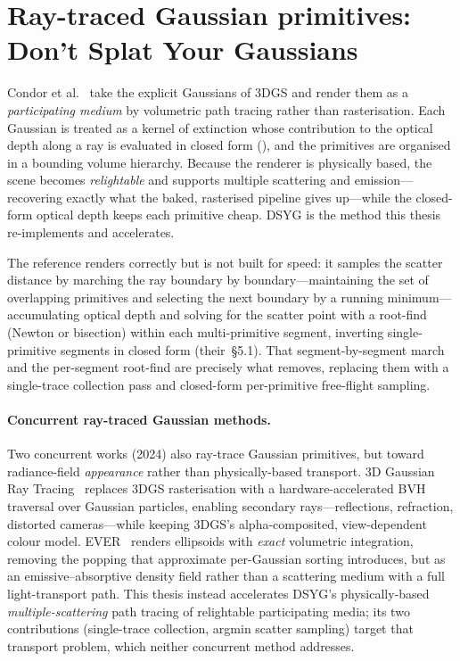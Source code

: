 \section{Ray-traced Gaussian primitives: Don't Splat Your Gaussians}
\label{sec:dsyg}

Condor et al.~\cite{DSYG} take the explicit Gaussians of 3DGS and render them as a
\emph{participating medium} by volumetric path tracing rather than rasterisation. Each Gaussian is
treated as a kernel of extinction whose contribution to the optical depth along a ray is evaluated
in closed form (), and the primitives are organised in a bounding volume
hierarchy. Because the renderer is physically based, the scene becomes \emph{relightable} and
supports multiple scattering and emission---recovering exactly what the baked, rasterised pipeline
gives up---while the closed-form optical depth keeps each primitive cheap. DSYG is the method this
thesis re-implements and accelerates.

The reference renders correctly but is not built for speed: it samples the scatter distance by
marching the ray boundary by boundary---maintaining the set of overlapping primitives and selecting
the next boundary by a running minimum---accumulating optical depth and solving for the scatter point
with a root-find (Newton or bisection) within each multi-primitive segment, inverting single-primitive
segments in closed form (their~\S5.1). That segment-by-segment
march and the per-segment root-find are precisely what  removes, replacing them
with a single-trace collection pass and closed-form per-primitive free-flight sampling.

\paragraph{Concurrent ray-traced Gaussian methods.} Two concurrent works (2024) also ray-trace
Gaussian primitives, but toward radiance-field \emph{appearance} rather than physically-based
transport. 3D Gaussian Ray Tracing~\cite{3DGRT} replaces 3DGS rasterisation with a hardware-accelerated
BVH traversal over Gaussian particles, enabling secondary rays---reflections, refraction, distorted
cameras---while keeping 3DGS's alpha-composited, view-dependent colour model. EVER~\cite{EVER} renders
ellipsoids with \emph{exact} volumetric integration, removing the popping that approximate per-Gaussian
sorting introduces, but as an emissive--absorptive density field rather than a scattering medium with a
full light-transport path. This thesis instead accelerates DSYG's physically-based
\emph{multiple-scattering} path tracing of relightable participating media; its two contributions
(single-trace collection, argmin scatter sampling) target that transport problem, which neither
concurrent method addresses.


